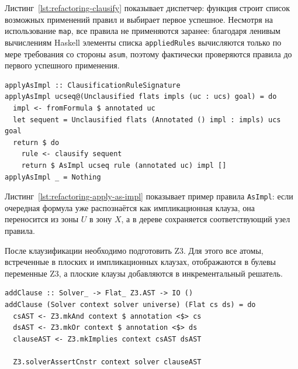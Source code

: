 \documentclass[14pt, russian]{scrartcl}
\begin{document}
Листинг~\ref{lst:refactoring-clausify} показывает диспетчер: функция строит
список возможных применений правил и выбирает первое успешное. Несмотря на
использование \texttt{map}, все правила не применяются заранее: благодаря
ленивым вычислениям Haskell элементы списка \texttt{appliedRules} вычисляются
только по мере требования со стороны \texttt{asum}, поэтому фактически
проверяются правила до первого успешного применения.

\begin{listing}[!htb]
\caption{Правило клаузификации \texttt{applyAsImpl}}
\label{lst:refactoring-apply-as-impl}
\begin{verbatim}
applyAsImpl :: ClausificationRuleSignature
applyAsImpl ucseq@(Unclausified flats impls (uc : ucs) goal) = do
  impl <- fromFormula $ annotated uc
  let sequent = Unclausified flats (Annotated () impl : impls) ucs goal
  return $ do
    rule <- clausify sequent
    return $ AsImpl ucseq rule (annotated uc) impl []
applyAsImpl _ = Nothing
\end{verbatim}
\end{listing}

Листинг~\ref{lst:refactoring-apply-as-impl} показывает пример правила
\texttt{AsImpl}: если очередная формула уже распознаётся как импликационная
клауза, она переносится из зоны $U$ в зону $X$, а в дереве сохраняется
соответствующий узел правила.

После клаузификации необходимо подготовить Z3. Для этого все атомы, встреченные
в плоских и импликационных клауза\-х, отображаются в булевы переменные Z3, а
плоские клаузы добавляются в инкрементальный решатель.

\begin{listing}[!htb]
\caption{Добавление плоской клаузы в Z3: \texttt{addClause}}
\label{lst:refactoring-add-clause}
\begin{verbatim}
addClause :: Solver_ -> Flat_ Z3.AST -> IO ()
addClause (Solver context solver universe) (Flat cs ds) = do
  csAST <- Z3.mkAnd context $ annotation <$> cs
  dsAST <- Z3.mkOr context $ annotation <$> ds
  clauseAST <- Z3.mkImplies context csAST dsAST

  Z3.solverAssertCnstr context solver clauseAST
\end{verbatim}
\end{listing}
\end{document}

